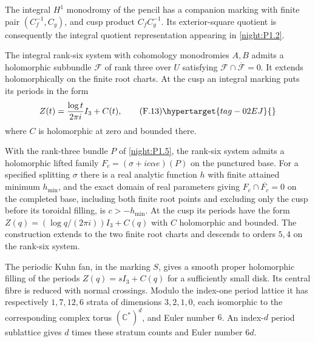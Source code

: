 \begin{theorem}\hypertarget{tag-02QY}{}\label{night:P1.7}
The integral $H^1$ monodromy of the pencil has a companion marking with
finite pair $(C_f^{-1},C_g)$, and cusp product $C_fC_g^{-1}$.
Its exterior-square quotient is consequently the integral quotient
representation appearing in \cref{night:P1.2}.
\end{theorem}

\begin{theorem}\hypertarget{tag-02O8}{}\label{maps:src:F.3.6}


The integral rank-six system with cohomology monodromies $A,B$
admits a holomorphic subbundle $\mathcal F$ of rank three over
$U$ satisfying $\mathcal F\cap\overline{\mathcal F}=0$.
It extends holomorphically on the finite root charts.  At the
cusp an integral marking puts its periods in the form
\[
 Z(t)=\frac{\log t}{2\pi i}I_3+C(t),
 \tag{F.13}\hypertarget{tag-02EJ}{}\label{maps:eq:F.13}
\]
where $C$ is holomorphic at zero and bounded there.

\end{theorem}

\begin{theorem}\hypertarget{tag-02QZ}{}\label{night:P1.8}
With the rank-three bundle $P$ of \cref{night:P1.5}, the rank-six
system admits a holomorphic lifted family
$F_c=(\sigma+ic\alpha e)(P)$ on the punctured base.
For a specified splitting $\sigma$ there is a real analytic function
$h$ with finite attained minimum $h_{\min}$, and the exact domain of
real parameters giving $F_c\cap\overline{F_c}=0$ on the completed
base, including both finite root points and excluding only the cusp
before its toroidal filling, is $c>-h_{\min}$.
At the cusp its periods have the form
$Z(q)=(\log q/(2\pi i))I_3+C(q)$ with $C$ holomorphic and bounded.
The construction extends to the two finite root charts and descends to
orders $5,4$ on the rank-six system.
\end{theorem}

\begin{theorem}\hypertarget{tag-02R0}{}\label{night:P1.9}
The periodic Kuhn fan, in the marking $S$, gives a smooth proper
holomorphic filling of the periods $Z(q)=sI_3+C(q)$ for a sufficiently
small disk.  Its central fibre is reduced with normal crossings.
Modulo the index-one period lattice it has respectively $1,7,12,6$
strata of dimensions $3,2,1,0$, each isomorphic to the corresponding
complex torus $(\mathbb C^*)^d$, and Euler number $6$.
An index-$d$ period sublattice gives $d$ times these stratum counts and
Euler number $6d$.
\end{theorem}

